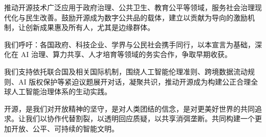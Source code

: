 推动开源技术广泛应用于政府治理、公共卫生、教育公平等领域，服务社会治理现代化与民生改善。鼓励开源成为数字公共品的载体，建立以贡献为导向的激励机制，让创新成果惠及所有人，尤其是边缘群体。


我们呼吁：各国政府、科技企业、学界与公民社会携手同行，以本宣言为基础，深化在 AI 治理、算力共享、人才培育等领域的务实合作，争取早期收获。

我们支持依托联合国及相关国际机制，围绕人工智能伦理准则、跨境数据流动规则、AI 版权保护等紧迫议题展开对话，凝聚共识，推动开源成为构建公正合理全球人工智能治理体系的生动实践。


开源，是我们对开放精神的坚守，是对人类团结的信念，是对更美好世界的共同追求。让我们以协作代替割裂，以透明回应质疑，以共享消弭垄断。共同构建一个更加开放、公平、可持续的智能文明。

\par

\endgroup
\clearpage



